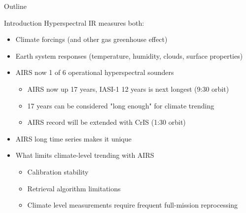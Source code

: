 \documentclass[presentation]{beamer}
\author{L. Larrabee Strow}
\date{\today}
\title{}
\begin{document}
\begin{frame}{Outline}
\tableofcontents
\end{frame}

\begin{frame}[label={sec:orgc4296bb}]{Introduction}
Hyperspectral IR measures both:
\begin{itemize}
\item Climate forcings (\cd and other gas greenhouse effect)
\item Earth system responses (temperature, humidity, clouds, surface properties)
\end{itemize}
\begin{itemize}
\item AIRS now 1 of 6 operational hyperspectral sounders
\begin{itemize}
\item AIRS now up 17 years, IASI-1 12 years is next longest (9:30 orbit)
\item 17 years can be considered "long enough" for climate trending
\item AIRS record will be extended with CrIS (1:30 orbit)
\end{itemize}

\item AIRS long time series makes it unique
\item What limits climate-level trending with AIRS
\begin{itemize}
\item Calibration stability
\item Retrieval algorithm limitations
\item Climate level measurements require frequent full-mission reprocessing
\end{itemize}
\end{itemize}
\end{frame}
\end{document}
